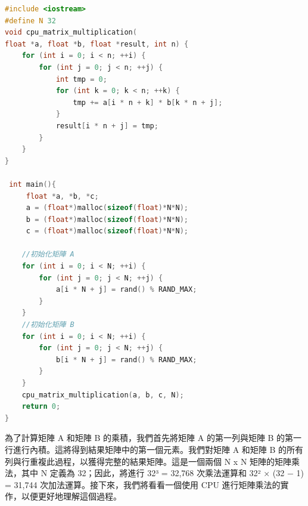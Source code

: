 \begin{lstlisting}[language=c++,caption={矩陣乘法的cpu實作}]
#include <iostream>
#define N 32
void cpu_matrix_multiplication(
float *a, float *b, float *result, int n) {
    for (int i = 0; i < n; ++i) {
        for (int j = 0; j < n; ++j) {
            int tmp = 0;
            for (int k = 0; k < n; ++k) {
                tmp += a[i * n + k] * b[k * n + j];
            }
            result[i * n + j] = tmp;
        }
    }
}

 int main(){
     float *a, *b, *c;
     a = (float*)malloc(sizeof(float)*N*N);
     b = (float*)malloc(sizeof(float)*N*N);
     c = (float*)malloc(sizeof(float)*N*N);
    
    //初始化矩陣 A
    for (int i = 0; i < N; ++i) {
        for (int j = 0; j < N; ++j) {
            a[i * N + j] = rand() % RAND_MAX;
        }
    }
    //初始化矩陣 B
    for (int i = 0; i < N; ++i) {
        for (int j = 0; j < N; ++j) {
            b[i * N + j] = rand() % RAND_MAX;
        }
    }
    cpu_matrix_multiplication(a, b, c, N);
    return 0;
}
\end{lstlisting}


為了計算矩陣 A 和矩陣 B 的乘積，我們首先將矩陣 A 的第一列與矩陣 B 的第一行進行內積。這將得到結果矩陣中的第一個元素。我們對矩陣 A 和矩陣 B 的所有列與行重複此過程，以獲得完整的結果矩陣。這是一個兩個 N x N 矩陣的矩陣乘法，其中 N 定義為 32；因此，將進行 32³ = 32,768 次乘法運算和 32² × (32 − 1) = 31,744 次加法運算。接下來，我們將看看一個使用 CPU 進行矩陣乘法的實作，以便更好地理解這個過程。



